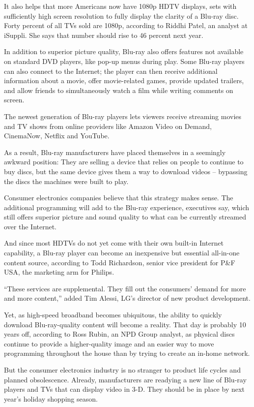 ﻿\documentclass[12pt]{article}
\begin{document}
It also helps that more Americans now have 1080p HDTV displays, sets with sufficiently high screen
resolution to fully display the clarity of a Blu-ray disc. Forty percent of all TVs sold are 1080p,
according to Riddhi Patel, an analyst at iSuppli. She says that number should rise to 46 percent
next year.

In addition to superior picture quality, Blu-ray also offers features not available on standard DVD
players, like pop-up menus during play. Some Blu-ray players can also connect to the Internet; the
player can then receive additional information about a movie, offer movie-related games, provide
updated trailers, and allow friends to simultaneously watch a film while writing comments on screen.

The newest generation of Blu-ray players lets viewers receive streaming movies and TV shows from
online providers like Amazon Video on Demand, CinemaNow, Netflix and YouTube.

As a result, Blu-ray manufacturers have placed themselves in a seemingly awkward position: They are
selling a device that relies on people to continue to buy discs, but the same device gives them a
way to download videos -- bypassing the discs the machines were built to play.

Consumer electronics companies believe that this strategy makes sense. The additional programming
will add to the Blu-ray experience, executives say, which still offers superior picture and sound
quality to what can be currently streamed over the Internet.

And since most HDTVs do not yet come with their own built-in Internet capability, a Blu-ray player
can become an inexpensive but essential all-in-one content source, according to Todd Richardson,
senior vice president for P\&F USA, the marketing arm for Philips.

``These services are supplemental. They fill out the consumers' demand for more and more content,''
added Tim Alessi, LG's director of new product development.

Yet, as high-speed broadband becomes ubiquitous, the ability to quickly download Blu-ray-quality
content will become a reality. That day is probably 10 years off, according to Ross Rubin, an NPD
Group analyst, as physical discs continue to provide a higher-quality image and an easier way to
move programming throughout the house than by trying to create an in-home network.

But the consumer electronics industry is no stranger to product life cycles and planned
obsolescence. Already, manufacturers are readying a new line of Blu-ray players and TVs that can
display video in 3-D. They should be in place by next year's holiday shopping season.
\end{document}
